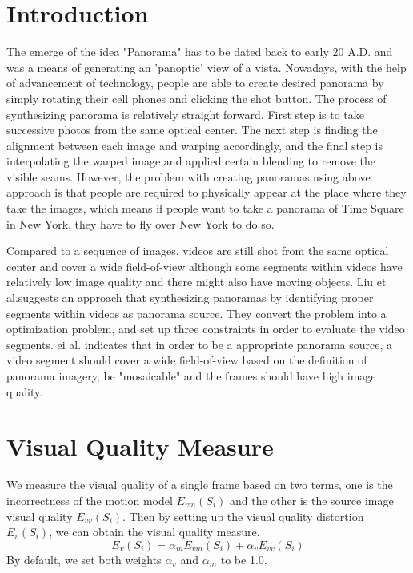 \documentclass[12pt]{article}
\begin{document}
\section{Introduction}
The emerge of the idea "Panorama" has to be dated back to early 20 A.D. and was a means of generating an 'panoptic' view of a vista\cite{wikipedia}. Nowadays, 
with the help of advancement of technology, people are able to create desired panorama by simply rotating their cell phones and clicking the shot button. The process of synthesizing panorama is relatively straight forward. First step is to take successive photos from the same optical center. The next step is finding the alignment between
each image and warping accordingly, and the final step is interpolating the warped image and applied certain blending to remove the visible seams. However, the problem with creating
panoramas using above approach is that people are required to physically appear at the place where they take the images, which means if people want to take a panorama of Time Square in New York, they have to fly over New York to do so. \par
Compared to a sequence of images, videos are still shot from the same optical center and cover a wide field-of-view although some segments within videos have relatively low image quality and there might also have moving objects. Liu et al.\cite{Liu}suggests an approach that synthesizing panoramas by identifying proper segments within videos as panorama source. They convert the problem into a optimization problem, and set up three constraints in order to evaluate the video segments.\cite{Liu} ei al. indicates that in order to be a appropriate panorama source, a video segment should cover a wide field-of-view based on the definition of panorama imagery,  be "mosaicable" and the frames should have high image quality\cite{Liu}.

\section{Visual Quality Measure}
We measure the visual quality of a single frame based on two terms, one is the incorrectness of the motion model $\mathit{E_{vm}(S_i)}$ and the other is the source image visual quality $\mathit{E_{vv}(S_i)}$. Then by setting up the visual quality distortion $\mathit{E_v(S_i)}$, we can obtain the visual quality measure.
\begin{equation}
\mathit{E_v(S_i)} = \alpha_m\mathit{E_{vm}(S_i)} + \alpha_v\mathit{E_{vv}(S_i)}
\end{equation}
By default, we set both weights $\alpha_v$ and $\alpha_m$ to be 1.0.
\end{document}

